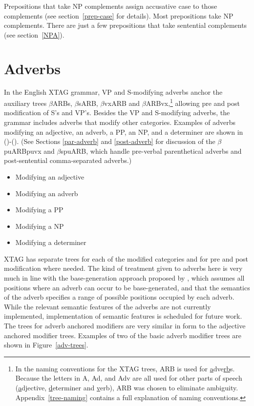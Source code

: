 Prepositions that take NP complements assign accusative case to those
complements (see section~\ref{prep-case} for details).  Most prepositions take
NP complements.  There are just a few prepositions that take sentential
complements (see section~\ref{NPA}).


\section{Adverbs}
\label{adv-modifier}

In the English XTAG grammar, VP and S-modifying adverbs anchor the
auxiliary trees $\beta$ARBs, $\beta$sARB, $\beta$vxARB and
$\beta$ARBvx,\footnote{In the naming conventions for the XTAG trees,
ARB is used for {\underline a}dve{\underline {rb}}s.  Because the
letters in A, Ad, and Adv are all used for other parts of speech
({\underline a}djective, {\underline d}eterminer and {\underline
v}erb), ARB was chosen to eliminate ambiguity.
Appendix~\ref{tree-naming} contains a full explanation of naming
conventions.}  allowing pre and post modification of S's and VP's.
Besides the VP and S-modifying adverbs, the grammar includes adverbs
that modify other categories. Examples of adverbs modifying an
adjective, an adverb, a PP, an NP, and a determiner are shown in
()-(). (See Sections \ref{par-adverb} and
\ref{post-adverb} for discussion of the $\beta$puARBpuvx and
$\beta$spuARB, which handle pre-verbal parenthetical adverbs and
post-sentential comma-separated adverbs.)

\begin{itemize}
\item{Modifying an adjective}

\item{Modifying an adverb}

\item{Modifying a PP}

\item{Modifying a NP}

\item{Modifying a determiner}

\end{itemize}

XTAG has separate trees for each of the modified categories and for pre and
post modification where needed.  The kind of treatment given to adverbs here is
very much in line with the base-generation approach proposed by \cite{Ernst84},
which assumes all positions where an adverb can occur to be base-generated, and
that the semantics of the adverb specifies a range of possible positions
occupied by each adverb. While the relevant semantic features of the adverbs
are not currently implemented, implementation of semantic features is scheduled
for future work.  The trees for adverb anchored modifiers are very similar in
form to the adjective anchored modifier trees.  Examples of two of the basic
adverb modifier trees are shown in Figure~\ref{adv-trees}.

